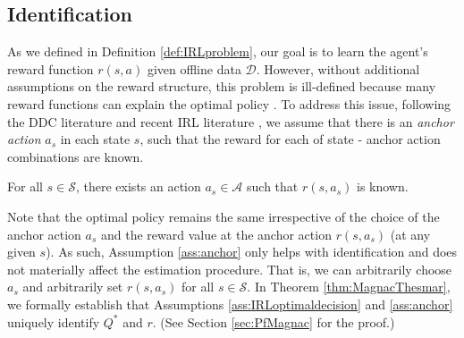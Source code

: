 \subsection{Identification}
 
As we defined in Definition \ref{def:IRLproblem}, our goal is to learn the agent's reward function $r(s, a)$ given offline data $\mathcal{D}$.
However, without additional assumptions on the reward structure, this problem is ill-defined because many reward functions can explain the optimal policy \citep{fu2017learning, ng1999policy}. To address this issue, following the DDC literature  \citep{rust1994structural, magnac2002identifying, hotz1993conditional} and recent IRL literature \citep{geng2020deep}, we assume that there is an \textit{anchor action} $a_s$ in each state $s$, such that the reward for each of state - anchor action combinations are known.

\begin{asmp}\label{ass:anchor} For all $s\in\mathcal{S}$, there exists an action $a_s\in \mathcal{A}$ such that $r(s,a_s)$ is known.
\end{asmp} 

\noindent Note that the optimal policy remains the same irrespective of the choice of the anchor action $a_s$ and the reward value at the anchor action $r(s, a_s)$ (at any given $s$). As such, Assumption \ref{ass:anchor} only helps with identification and does not materially affect the estimation procedure. That is, we can arbitrarily choose $a_s$ and arbitrarily set $r(s,a_s)$ for all $s\in\mathcal{S}$.
In Theorem \ref{thm:MagnacThesmar}, we formally establish that Assumptions \ref{ass:IRLoptimaldecision} and \ref{ass:anchor} uniquely identify $Q^\ast$ and $r$. (See Section \ref{sec:PfMagnac} for the proof.)

